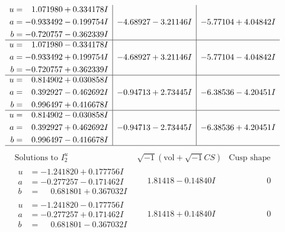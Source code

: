 \documentclass[1p]{elsarticle_modified}
\theoremstyle{definition}
\newcommand{\I}{\sqrt{-1}}
\begin{document}
$$\begin{array}{c|c|c}
\begin{aligned}
u &= \phantom{-}1.071980 + 0.334178 I \\
a &= -0.933492 - 0.199754 I \\
b &= -0.720757 - 0.362339 I\end{aligned}
 & -4.68927 - 3.21146 I & -5.77104 + 4.04842 I \\ \hline\begin{aligned}
u &= \phantom{-}1.071980 - 0.334178 I \\
a &= -0.933492 + 0.199754 I \\
b &= -0.720757 + 0.362339 I\end{aligned}
 & -4.68927 + 3.21146 I & -5.77104 - 4.04842 I \\ \hline\begin{aligned}
u &= \phantom{-}0.814902 + 0.030858 I \\
a &= \phantom{-}0.392927 - 0.462692 I \\
b &= \phantom{-}0.996497 + 0.416678 I\end{aligned}
 & -0.94713 + 2.73445 I & -6.38536 - 4.20451 I \\ \hline\begin{aligned}
u &= \phantom{-}0.814902 - 0.030858 I \\
a &= \phantom{-}0.392927 + 0.462692 I \\
b &= \phantom{-}0.996497 - 0.416678 I\end{aligned}
 & -0.94713 - 2.73445 I & -6.38536 + 4.20451 I\\
 \hline 
 \end{array}$$\newpage$$\begin{array}{c|c|c}  
\text{Solutions to }I^u_{2}& \I (\text{vol} + \sqrt{-1}CS) & \text{Cusp shape}\\
 \hline 
\begin{aligned}
u &= -1.241820 + 0.177756 I \\
a &= -0.277257 - 0.171462 I \\
b &= \phantom{-}0.681801 + 0.367032 I\end{aligned}
 & \phantom{-}1.81418 - 0.14840 I & \phantom{-0.000000 } 0 \\ \hline\begin{aligned}
u &= -1.241820 - 0.177756 I \\
a &= -0.277257 + 0.171462 I \\
b &= \phantom{-}0.681801 - 0.367032 I\end{aligned}
 & \phantom{-}1.81418 + 0.14840 I & \phantom{-0.000000 } 0 \\ \hline\begin{aligned}

\end{aligned}
\end{array}$$
\end{document}
